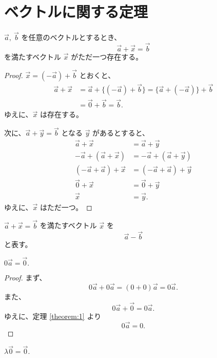 \chapter{ベクトルに関する定理}

\begin{thm}\label{theorem:1}
  \(\vec{a},\ \vec{b}\) を任意のベクトルとするとき、
  \[\vec{a}+\vec{x}=\vec{b}\]
  を満たすベクトル \(\vec{x}\) がただ一つ存在する。
\end{thm}

\begin{proof}
  \(\vec{x}=(-\vec{a})+\vec{b}\) とおくと、
  \begin{align*}
    \vec{a}+\vec{x} &= \vec{a}+\{(-\vec{a})+\vec{b}\}=\{\vec{a}+(-\vec{a})\}+\vec{b} \\
                    &= \vec{0}+\vec{b}=\vec{b}.
  \end{align*}
  ゆえに、\(\vec{x}\) は存在する。

  次に、\(\vec{a}+\vec{y}=\vec{b}\) となる \(\vec{y}\) があるとすると、
  \begin{align*}
               \vec{a}+\vec{x} &= \vec{a}+\vec{y} \\
    -\vec{a}+(\vec{a}+\vec{x}) &= -\vec{a}+(\vec{a}+\vec{y}) \\
    (-\vec{a}+\vec{a})+\vec{x} &= (-\vec{a}+\vec{a})+\vec{y} \\
               \vec{0}+\vec{x} &= \vec{0}+\vec{y} \\
                       \vec{x} &= \vec{y}.
  \end{align*}
  ゆえに、\(\vec{x}\) はただ一つ。
\end{proof}

\begin{dfn}
  \(\vec{a}+\vec{x}=\vec{b}\) を満たすベクトル \(\vec{x}\) を
  \[\vec{a}-\vec{b}\]
  と表す。
\end{dfn}

\begin{thm}\label{theorem:2}
  \(0\vec{a}=\vec{0}.\)
\end{thm}

\begin{proof}
  まず、
  \[0\vec{a}+0\vec{a}=(0+0)\vec{a}=0\vec{a}.\]
  また、
  \[0\vec{a}+\vec{0}=0\vec{a}.\]
  ゆえに、定理 \ref{theorem:1} より
  \[0\vec{a}=0.\]
\end{proof}

\begin{thm}\label{theorem:3}
  \(\lambda\vec{0}=\vec{0}.\)
\end{thm}

